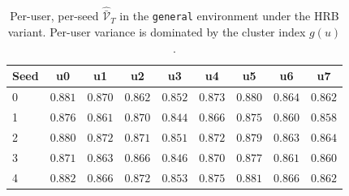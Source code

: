 \documentclass{article} %
\begin{document}
\begin{table}[h]
\centering
\small
\caption{Per-user, per-seed $\widehat{\bar{\mathcal V}}_T$ in the \texttt{general} environment under the \textnormal{HRB} variant. Per-user variance is dominated by the cluster index $g(u)$.}
\label{tab:app-peruser}
\begin{tabular}{lcccccccc}
\toprule
Seed & u0 & u1 & u2 & u3 & u4 & u5 & u6 & u7 \\
\midrule
0 & $0.881$ & $0.870$ & $0.862$ & $0.852$ & $0.873$ & $0.880$ & $0.864$ & $0.862$ \\
1 & $0.876$ & $0.861$ & $0.870$ & $0.844$ & $0.866$ & $0.875$ & $0.860$ & $0.858$ \\
2 & $0.880$ & $0.872$ & $0.871$ & $0.851$ & $0.872$ & $0.879$ & $0.863$ & $0.864$ \\
3 & $0.871$ & $0.863$ & $0.866$ & $0.846$ & $0.870$ & $0.877$ & $0.861$ & $0.860$ \\
4 & $0.882$ & $0.866$ & $0.872$ & $0.853$ & $0.875$ & $0.881$ & $0.866$ & $0.862$ \\
\bottomrule
\end{tabular}

\end{table}

\clearpage
\end{document}
